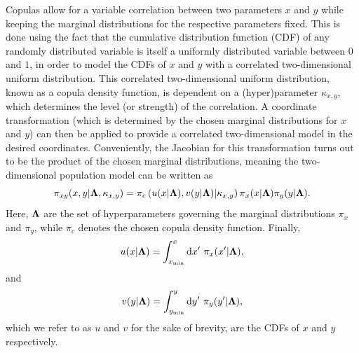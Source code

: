 Copulas allow for a variable correlation between two parameters $x$ and $y$ while keeping the marginal distributions for the respective parameters fixed.
This is done using the fact that the cumulative distribution function (CDF) of any randomly distributed variable is itself a uniformly distributed variable between $0$ and $1$, in order to model the CDFs of $x$ and $y$ with a correlated two-dimensional uniform distribution.
This correlated two-dimensional uniform distribution, known as a copula density function, is dependent on a (hyper)parameter $\kappa_{x,y}$, which determines the level (or strength) of the correlation.
A coordinate transformation (which is determined by the chosen marginal distributions for $x$ and $y$) can then be applied to provide a correlated two-dimensional model in the desired coordinates.
Conveniently, the Jacobian for this transformation turns out to be the product of the chosen marginal distributions, meaning the two-dimensional population model can be written as
\begin{equation}
    \pi_{xy}(x,y|\boldsymbol{\Lambda},\kappa_{x,y}) = \pi_c \left(u(x|\boldsymbol{\Lambda}),v(y|\boldsymbol{\Lambda})|\kappa_{x,y}\right) \pi_x(x|\boldsymbol{\Lambda}) \pi_y(y|\boldsymbol{\Lambda}).
\end{equation}
Here, $\boldsymbol{\Lambda}$ are the set of hyperparameters governing the marginal distributions $\pi_x$ and $\pi_y$, while $\pi_c$ denotes the chosen copula density function.
Finally,
\begin{equation}
    u(x|\boldsymbol{\Lambda}) = \int_{x_{\min}}^x \mathrm{d} x' \ \pi_x(x'|\boldsymbol{\Lambda}),
\end{equation}
and
\begin{equation}
    v(y|\boldsymbol{\Lambda}) = \int_{y_{\min}}^y \mathrm{d} y' \ \pi_y(y'|\boldsymbol{\Lambda}),
\end{equation}
which we refer to as $u$ and $v$ for the sake of brevity, are the CDFs of $x$ and $y$ respectively.

